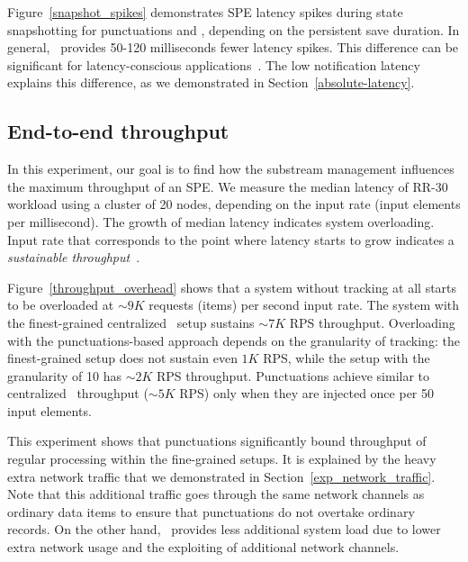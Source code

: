 Figure~\ref{snapshot_spikes} demonstrates SPE latency spikes during state snapshotting for punctuations and \tracker, depending on the persistent save duration. In general, \tracker\ provides 50-120 milliseconds fewer latency spikes. This difference can be significant for latency-conscious applications~\cite{zhang2017sub}. The low notification latency explains this difference, as we demonstrated in Section~\ref{absolute-latency}. 


\subsection{End-to-end throughput}
In this experiment, our goal is to find how the substream management influences the maximum throughput of an SPE. We measure the median latency of RR-30 workload using a cluster of 20 nodes, depending on the input rate (input elements per millisecond). The growth of median latency indicates system overloading. Input rate that corresponds to the point where latency starts to grow indicates a {\em sustainable throughput}~\cite{karimov2018benchmarking}.

Figure~\ref{throughput_overhead} shows that a system without tracking at all starts to be overloaded at $\sim 9K$ requests (items) per second input rate. The system with the finest-grained centralized \tracker\ setup sustains $\sim 7K$ RPS throughput. Overloading with the punctuations-based approach depends on the granularity of tracking: the finest-grained setup does not sustain even $1K$ RPS, while the setup with the granularity of 10 has $\sim 2K$ RPS throughput. Punctuations achieve similar to centralized \tracker\ throughput ($\sim 5K$ RPS) only when they are injected once per 50 input elements.

This experiment shows that punctuations significantly bound throughput of regular processing within the fine-grained setups. It is explained by the heavy extra network traffic that we demonstrated in Section~\ref{exp_network_traffic}. Note that this additional traffic goes through the same network channels as ordinary data items to ensure that punctuations do not overtake ordinary records. On the other hand, \tracker\ provides less additional system load due to lower extra network usage and the exploiting of additional network channels.

